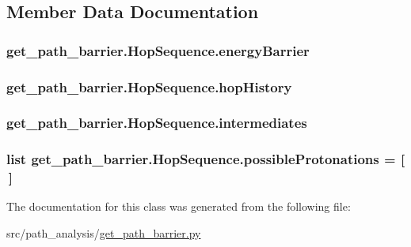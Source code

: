 \subsection{Member Data Documentation}
\hypertarget{classget__path__barrier_1_1_hop_sequence_a0bcfd627eb7a3a1adbcea611d1e4b6a6}{
\subsubsection[{energy\-Barrier}]{\setlength{\rightskip}{0pt plus 5cm}get\-\_\-path\-\_\-barrier.\-Hop\-Sequence.\-energy\-Barrier}}\label{classget__path__barrier_1_1_hop_sequence_a0bcfd627eb7a3a1adbcea611d1e4b6a6}
\hypertarget{classget__path__barrier_1_1_hop_sequence_a579cbd71947f980116542947f6fc3bb3}{
\subsubsection[{hop\-History}]{\setlength{\rightskip}{0pt plus 5cm}get\-\_\-path\-\_\-barrier.\-Hop\-Sequence.\-hop\-History}}\label{classget__path__barrier_1_1_hop_sequence_a579cbd71947f980116542947f6fc3bb3}
\hypertarget{classget__path__barrier_1_1_hop_sequence_aa539256b485b15e0bfb1388e832c4060}{
\subsubsection[{intermediates}]{\setlength{\rightskip}{0pt plus 5cm}get\-\_\-path\-\_\-barrier.\-Hop\-Sequence.\-intermediates}}\label{classget__path__barrier_1_1_hop_sequence_aa539256b485b15e0bfb1388e832c4060}
\hypertarget{classget__path__barrier_1_1_hop_sequence_a1ddfff32b9b3d13841eaf9fcaceba041}{
\subsubsection[{possible\-Protonations}]{\setlength{\rightskip}{0pt plus 5cm}list get\-\_\-path\-\_\-barrier.\-Hop\-Sequence.\-possible\-Protonations = \mbox{[}$\,$\mbox{]}\hspace{0.3cm}{\ttfamily [static]}}}\label{classget__path__barrier_1_1_hop_sequence_a1ddfff32b9b3d13841eaf9fcaceba041}


The documentation for this class was generated from the following file\-:\begin{DoxyCompactItemize}
\item 
src/path\-\_\-analysis/\hyperlink{get__path__barrier_8py}{get\-\_\-path\-\_\-barrier.\-py}\end{DoxyCompactItemize}
